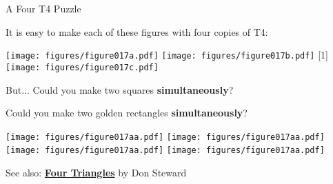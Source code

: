 \documentclass[14pt]{beamer}
\begin{document}

    \begin{frame}{A Four T4 Puzzle}
        \begin{center}
            {\small It is easy to make each of these figures with four copies of T4:}

            \bigskip\medskip

            \texttt{[image: figures/figure017a.pdf]}\qquad
            \texttt{[image: figures/figure017b.pdf]}\quad\!
            \scalebox{-1}[1]{\texttt{[image: figures/figure017c.pdf]}}

            \bigskip\medskip

            {\small But... Could you make two squares \textbf{simultaneously}?\smallskip

            Could you make two golden rectangles \textbf{simultaneously}?}\bigskip\medskip

            \texttt{[image: figures/figure017aa.pdf]}\qquad
            \texttt{[image: figures/figure017aa.pdf]}\qquad
            \texttt{[image: figures/figure017aa.pdf]}\qquad
            \texttt{[image: figures/figure017aa.pdf]}\bigskip

            {\footnotesize See also: \textbf{\href{https://donsteward.blogspot.com.es/2012/03/four-triangles.html}{Four Triangles}} by Don Steward}
        \end{center}
    \end{frame}

\end{document}
